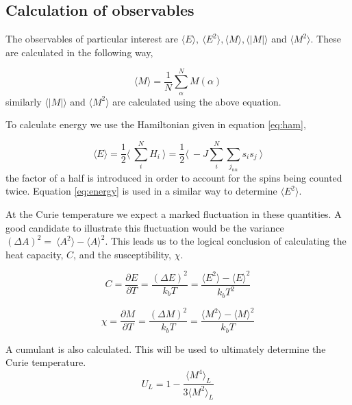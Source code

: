 \documentclass[a4paper]{article}
\newcommand{\bra}{\langle}
\newcommand{\ket}{\rangle}
\begin{document}
\subsection{Calculation of observables}

The observables of particular interest are $\bra E \ket,\ \bra E^2 \ket, 
\bra M \ket, \bra |M| \ket$ and $\bra M^2 \ket$. These are calculated in
the following way,

\begin{equation}
  \label{eq:magnetization}
  \bra M \ket = \frac{1}{N}\sum_{\alpha}^{N} M(\alpha)
\end{equation}similarly $\bra |M| \ket$ and $\bra M^2 \ket$ are calculated using the
above equation.

To calculate energy we use the Hamiltonian given in equation
\eqref{eq:ham},

\begin{equation}
  \label{eq:energy}  
  \bra E \ket=\frac{1}{2}\langle \ \sum_{i}^{N} H_i\ \rangle =\frac{1}{2}\langle \ -J
  \sum_{i}^{N}\sum_{j_{nn}} s_i s_j\ \rangle 
\end{equation}the factor of a half is introduced in order to account
for the spins being counted twice. Equation \eqref{eq:energy} is used
in a similar way to determine $\bra E^2 \ket$. 

At the Curie temperature we
expect a marked fluctuation in these quantities. A good candidate to
illustrate this fluctuation would be the variance $(\Delta A)^2 =~\bra
A^2 \ket - \bra A \ket^2$. This leads us to the logical conclusion of
calculating the heat capacity, $C$, and the susceptibility, $\chi$.

\begin{equation}
  \label{eq:heat_capacity}
  C =  \frac{\partial E}{\partial T} = \frac{(\Delta E)^2}{k_b T} =
  \frac{\bra E^2 \ket - \bra E \ket^2}{k_b T^2} 
\end{equation}

\begin{equation}
  \label{eq:susceptibility}
  \chi = \frac{\partial M}{\partial T} = \frac{(\Delta M)^2}{k_b T} =
  \frac{\bra M^2 \ket - \bra M \ket^2}{k_b T} 
\end{equation}

A cumulant is also calculated. This will be used to ultimately determine the
Curie temperature.  
\begin{equation}
  \label{eq:cum1}
  U_L=1-\frac{\langle M^4 \rangle_L}{3\langle M^2 \rangle_L}
\end{equation}
\end{document}
